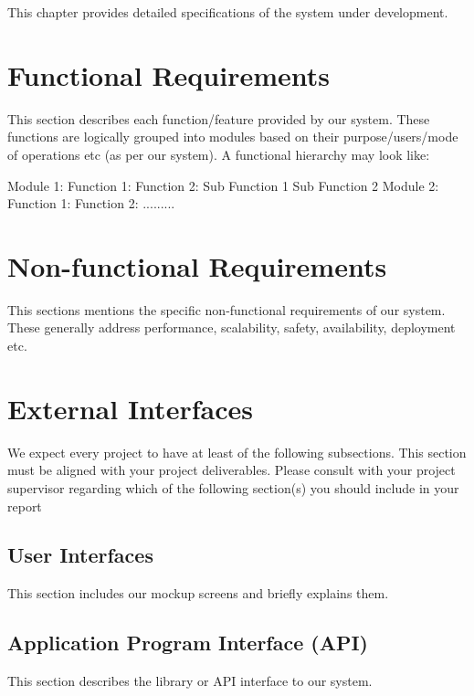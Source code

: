 This chapter provides detailed specifications of the system under development.

\section{Functional Requirements}

This section describes each function/feature provided by our system. These functions are logically grouped into modules based on their purpose/users/mode of operations etc (as per our system). A functional hierarchy may look like:
\begin{outline}
  \1 Module 1:
  \2 Function 1:
  \2 Function 2:
  \3 Sub Function 1
  \3 Sub Function 2
  \1 Module 2:
  \2 Function 1:
  \2 Function 2:
  \1 .........
\end{outline}


\section{Non-functional Requirements}

This sections mentions the specific non-functional requirements of our system. These generally address performance, scalability, safety, availability, deployment etc.

\section{External Interfaces}

We expect every project to have at least of the following subsections. This section must be aligned with your project deliverables. Please consult with your project supervisor regarding which of the following section(s) you should include in your report

\subsection{User Interfaces}
This section includes our mockup screens and briefly explains them.

\subsection{Application Program Interface (API)}
This section describes the library or API interface to our system.

